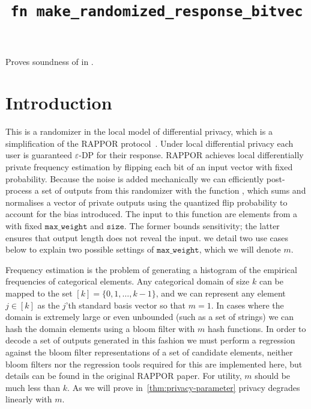 \documentclass{article}
\title{\texttt{fn make\_randomized\_response\_bitvec}}
\author{\AbigailGentleAuthor}
\begin{document}
\maketitle



\contrib

Proves soundness of  in .

\section{Introduction}
This is a randomizer in the local model of differential privacy, which is a simplification of the RAPPOR protocol~\cite{rappor}. Under local differential privacy each user is guaranteed $\varepsilon$-DP for their response. RAPPOR achieves local differentially private frequency estimation by flipping each bit of an input vector with fixed probability. Because the noise is added mechanically we can efficiently post-process a set of outputs from this randomizer with the function , which sums and normalises a vector of private outputs using the quantized flip probability to account for the bias introduced. The input to this function are elements from a  with fixed $\texttt{max\_weight}$ and $\texttt{size}$. The former bounds sensitivity; the latter ensures that output length does not reveal the input. we detail two use cases below to explain two possible settings of $\texttt{max\_weight}$, which we will denote $m$.

Frequency estimation is the problem of generating a histogram of the empirical frequencies of categorical elements. Any categorical domain of size $k$ can be mapped to the set $[k]=\{0,1,\ldots,k-1\}$, and we can represent any element $j\in[k]$ as the $j$'th standard basis vector so that $m=1$. In cases where the domain is extremely large or even unbounded (such as a set of strings) we can hash the domain elements using a bloom filter with $m$ hash functions. In order to decode a set of outputs generated in this fashion we must perform a regression against the bloom filter representations of a set of candidate elements, neither bloom filters nor the regression tools required for this are implemented here, but details can be found in the original RAPPOR paper. For utility, $m$ should be much less than $k$. As we will prove in~\ref{thm:privacy-parameter} privacy degrades linearly with $m$.
\end{document}
